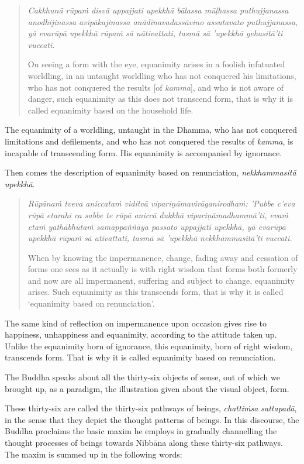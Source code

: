 \begin{quote}
\emph{Cakkhunā rūpaṁ disvā uppajjati upekkhā bālassa mūḷhassa puthujjanassa anodhijinassa avipākajinassa anādīnavadassāvino assutavato puthujjanassa, yā evarūpā upekkhā rūpaṁ sā nātivattati, tasmā sā 'upekkhā gehasitā'ti vuccati.}

On seeing a form with the eye, equanimity arises in a foolish infatuated worldling, in an untaught worldling who has not conquered his limitations, who has not conquered the results {[}of \emph{kamma}{]}, and who is not aware of danger, such equanimity as this does not transcend form, that is why it is called equanimity based on the household life.
\end{quote}

The equanimity of a worldling, untaught in the Dhamma, who has not conquered limitations and defilements, and who has not conquered the results of \emph{kamma}, is incapable of transcending form. His equanimity is accompanied by ignorance.

Then comes the description of equanimity based on renunciation, \emph{nekkhammasitā upekkhā}.

\begin{quote}
\emph{Rūpānaṁ tveva aniccataṁ viditvā vipariṇāmavirāganirodhaṁ: 'Pubbe c'eva rūpā etarahi ca sabbe te rūpā aniccā dukkhā vipariṇāmadhammā'ti, evaṁ etaṁ yathābhūtaṁ samappaññāya passato uppajjati upekkhā, yā evarūpā upekkhā rūpaṁ sā ativattati, tasmā sā 'upekkhā nekkhammasitā'ti vuccati.}

When by knowing the impermanence, change, fading away and cessation of forms one sees as it actually is with right wisdom that forms both formerly and now are all impermanent, suffering and subject to change, equanimity arises. Such equanimity as this transcends form, that is why it is called `equanimity based on renunciation'.
\end{quote}

The same kind of reflection on impermanence upon occasion gives rise to happiness, unhappiness and equanimity, according to the attitude taken up. Unlike the equanimity born of ignorance, this equanimity, born of right wisdom, transcends form. That is why it is called equanimity based on renunciation.

The Buddha speaks about all the thirty-six objects of sense, out of which we brought up, as a paradigm, the illustration given about the visual object, form.

These thirty-six are called the thirty-six pathways of beings, \emph{chattiṁsa sattapadā}, in the sense that they depict the thought patterns of beings. In this discourse, the Buddha proclaims the basic maxim he employs in gradually channelling the thought processes of beings towards Nibbāna along these thirty-six pathways. The maxim is summed up in the following words:

